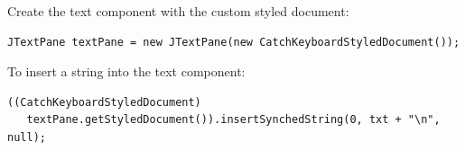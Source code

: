 \documentclass[11pt,a4paper]{article}
\begin{document}
Create the text component with the custom styled document:
\begin{verbatim}
JTextPane textPane = new JTextPane(new CatchKeyboardStyledDocument());
\end{verbatim}

To insert a string into the text component:
\begin{verbatim}
((CatchKeyboardStyledDocument)
   textPane.getStyledDocument()).insertSynchedString(0, txt + "\n", null);
\end{verbatim}




%


\newpage

\end{document}
